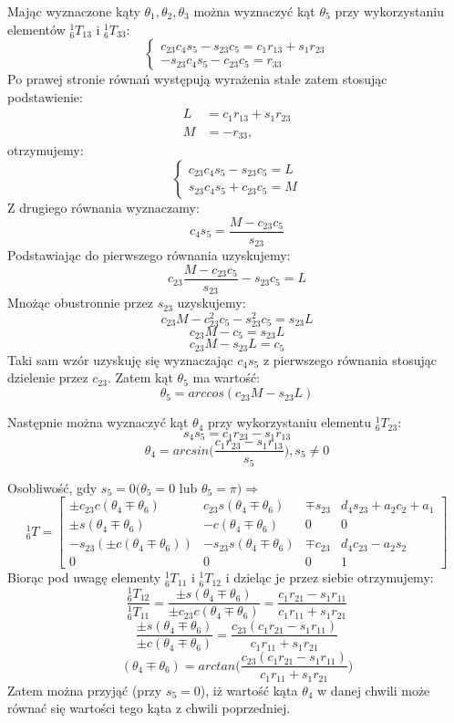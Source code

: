 \documentclass{article}
\begin{document}
Mając wyznaczone kąty $\theta_1,\theta_2,\theta_3$ można wyznaczyć kąt $\theta_5$ przy wykorzystaniu elementów $_6^1T_{13}$ i $_6^1T_{33}$:
\[
\begin{cases}
c_{23}c_4s_5-s_{23}c_5=c_1r_{13}+s_1r_{23}\\
-s_{23}c_4s_5-c_{23}c_5=r_{33}
\end{cases}
\]
Po prawej stronie równań występują wyrażenia stałe zatem stosując podstawienie:
\begin{align*}
L&=c_1r_{13}+s_1r_{23}\\
M&=-r_{33},
\end{align*}
otrzymujemy:
\[
\begin{cases}
c_{23}c_4s_5-s_{23}c_5=L\\
s_{23}c_4s_5+c_{23}c_5=M
\end{cases}
\]
Z drugiego równania wyznaczamy:
\[
c_4s_5=\dfrac{M-c_{23}c_5}{s_{23}}
\]
Podstawiając do pierwszego równania uzyskujemy:
\[
c_{23}\dfrac{M-c_{23}c_5}{s_{23}}-s_{23}c_5=L
\]
Mnożąc obustronnie przez $s_{23}$ uzyskujemy:
\[
c_{23}M-c_{23}^2c_5-s_{23}^2c_5=s_{23}L
\]
\[
c_{23}M-c_5=s_{23}L
\]
\[
c_{23}M-s_{23}L=c_5
\]
Taki sam wzór uzyskuję się wyznaczając $c_4s_5$ z pierwszego równania stosując dzielenie przez $c_{23}$.
Zatem kąt $\theta_5$  ma warto\'sć:
\[
\theta_5=arccos(c_{23}M-s_{23}L)
\]

Następnie można wyznaczyć kąt $\theta_4$ przy wykorzystaniu elementu $_6^1T_{23}$:
\[
s_4s_5=c_1r_{23}-s_1r_{13}
\]
\[
\theta_4=arcsin\Big(\dfrac{c_1r_{23}-s_1r_{13}}{s_5}\Big), s_5 \neq 0
\]

Osobliwo\'sć, gdy $s_5=0(\theta_5=0$ lub $ \theta_5=\pi) \Rightarrow$
\[
_{6}^{1}T= 
\begin{bmatrix}
\pm c_{23}c(\theta_4 \mp \theta_6)		&c_{23}s(\theta_4 \mp \theta_6)	&\mp s_{23}			&d_4s_{23}+a_2c_2+a_1	\\
\pm s(\theta_4 \mp \theta_6)			&-c(\theta_4 \mp \theta_6)		&0				&0				\\
-s_{23}(\pm c(\theta_4 \mp \theta_6))		&-s_{23}s(\theta_4 \mp \theta_6)	&\mp c_{23}			&d_4c_{23}-a_2s_2	\\
0							&0						&0				&1	
 \end{bmatrix}
\]
Biorąc pod uwagę elementy $_6^1T_{11}$ i $_6^1T_{12}$ i dzieląc je przez siebie otrzymujemy:
\[
\dfrac{_6^1T_{12}}{_6^1T_{11}}=\dfrac{\pm s(\theta_4 \mp \theta_6)}{\pm c_{23}c(\theta_4 \mp \theta_6)}=\dfrac{c_1r_{21}-s_1r_{11}}{c_1r_{11}+s_1r_{21}}
\]
\[
\dfrac{\pm s(\theta_4 \mp \theta_6)}{\pm c(\theta_4 \mp \theta_6)}=\dfrac{c_{23}(c_1r_{21}-s_1r_{11})}{c_1r_{11}+s_1r_{21}}
\]
\[
(\theta_4 \mp \theta_6)=arctan \Bigg(\dfrac{c_{23}(c_1r_{21}-s_1r_{11})}{c_1r_{11}+s_1r_{21}}\Bigg)
\]
Zatem można przyjąć (przy $s_5=0$), iż warto\'sć kąta $\theta_4$ w danej chwili może równać się warto\'sci tego kąta z chwili poprzedniej.
\end{document}
